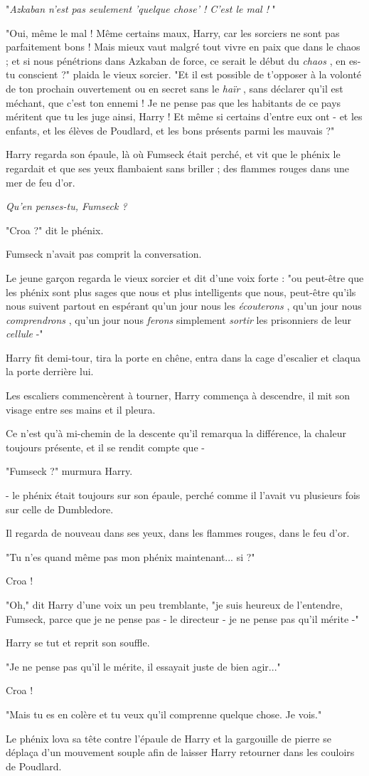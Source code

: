 "\emph{Azkaban n'est pas seulement 'quelque chose' ! C'est le mal !} "

"Oui, même le mal ! Même certains maux, Harry, car les sorciers ne sont pas parfaitement bons ! Mais mieux vaut malgré tout vivre en paix que dans le chaos ; et si nous pénétrions dans Azkaban de force, ce serait le début du \emph{chaos} , en es-tu conscient ?" plaida le vieux sorcier. "Et il est possible de t'opposer à la volonté de ton prochain ouvertement ou en secret sans le \emph{haïr} , sans déclarer qu'il est méchant, que c'est ton ennemi ! Je ne pense pas que les habitants de ce pays méritent que tu les juge ainsi, Harry ! Et même si certains d'entre eux ont - et les enfants, et les élèves de Poudlard, et les bons présents parmi les mauvais ?"

Harry regarda son épaule, là où Fumseck était perché, et vit que le phénix le regardait et que ses yeux flambaient sans briller ; des flammes rouges dans une mer de feu d'or.

\emph{Qu'en penses-tu, Fumseck ?} 

"Croa ?" dit le phénix.

Fumseck n'avait pas comprit la conversation.

Le jeune garçon regarda le vieux sorcier et dit d'une voix forte : "ou peut-être que les phénix sont plus sages que nous et plus intelligents que nous, peut-être qu'ils nous suivent partout en espérant qu'un jour nous les \emph{écouterons} , qu'un jour nous \emph{comprendrons} , qu'un jour nous \emph{ferons}  simplement \emph{sortir}  les prisonniers de leur \emph{cellule}  -"

Harry fit demi-tour, tira la porte en chêne, entra dans la cage d'escalier et claqua la porte derrière lui.

Les escaliers commencèrent à tourner, Harry commença à descendre, il mit son visage entre ses mains et il pleura.

Ce n'est qu'à mi-chemin de la descente qu'il remarqua la différence, la chaleur toujours présente, et il se rendit compte que -

"Fumseck ?" murmura Harry.

- le phénix était toujours sur son épaule, perché comme il l'avait vu plusieurs fois sur celle de Dumbledore.

Il regarda de nouveau dans ses yeux, dans les flammes rouges, dans le feu d'or.

"Tu n'es quand même pas mon phénix maintenant... si ?"

Croa !

"Oh," dit Harry d'une voix un peu tremblante, "je suis heureux de l'entendre, Fumseck, parce que je ne pense pas - le directeur - je ne pense pas qu'il mérite -"

Harry se tut et reprit son souffle.

"Je ne pense pas qu'il le mérite, il essayait juste de bien agir..."

Croa !

"Mais tu es en colère et tu veux qu'il comprenne quelque chose. Je vois."

Le phénix lova sa tête contre l'épaule de Harry et la gargouille de pierre se déplaça d'un mouvement souple afin de laisser Harry retourner dans les couloirs de Poudlard.

